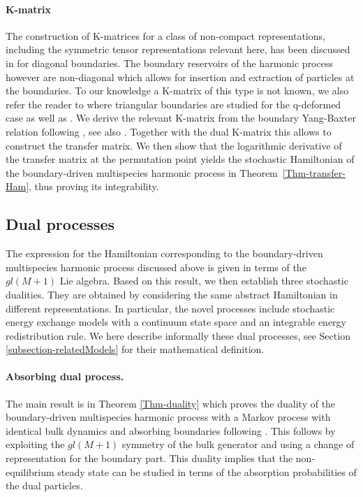 \documentclass[11pt]{article}
\numberwithin{equation}{section}
\begin{document}
\paragraph{K-matrix} The construction of K-matrices for a class of non-compact representations, including the symmetric tensor representations relevant here, has been discussed in \cite{Tsuboi:2018gfd} for diagonal boundaries. The boundary reservoirs of the harmonic process however are non-diagonal which allows for insertion and extraction of particles at the boundaries. To our knowledge a K-matrix of this type is not known, we also refer the reader to \cite{2024JPhA...57x5201K} where triangular boundaries are studied for the q-deformed case as well as \cite{2014JPhA...47C5202L}.  We derive the relevant K-matrix from the boundary Yang-Baxter relation following \cite{Frassek:2019vjt}, see also \cite{Antonenko:2024bgw}. Together with the dual K-matrix this allows to construct the transfer matrix. We then show that the logarithmic derivative of the transfer matrix at the permutation point yields the stochastic Hamiltonian of the boundary-driven multispecies harmonic process in Theorem~\eqref{Thm-transfer-Ham}, thus proving its integrability.






\subsection{Dual processes}

The expression
for the Hamiltonian corresponding
to the boundary-driven multispecies harmonic process discussed above
is given in terms of the 
$gl(M+1)$ Lie algebra.
Based on this result,
we then establish three stochastic dualities.
They are obtained by
considering the same 
abstract Hamiltonian in different representations.
In particular, the novel processes
include stochastic energy exchange models with a continuum state space
and an integrable energy redistribution rule.
We here describe informally these dual processes, see Section \ref{subsection-relatedModels} for their
mathematical definition.

\paragraph{Absorbing dual process.}
The main result
is in Theorem \ref{Thm-duality}
which proves the duality of the boundary-driven multispecies harmonic process with a Markov process with identical bulk dynamics and absorbing boundaries following \cite{Spohn_1983,kipnis1982heat}. This follows by
exploiting the $gl(M+1)$
symmetry of the bulk generator
and using a change of representation for the boundary
part. 
This duality implies that
the non-equilibrium steady state
can be studied in terms of
the absorption probabilities
of the dual particles.
\end{document}
